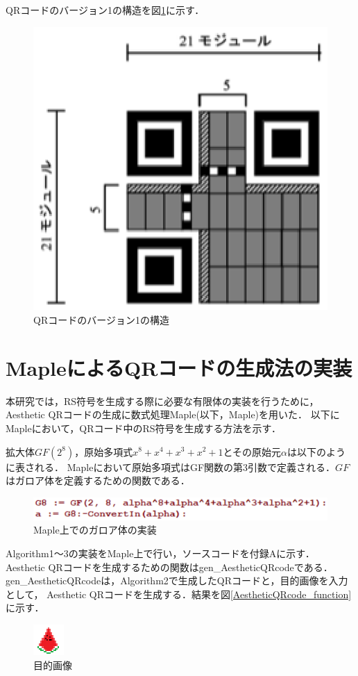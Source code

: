 \documentclass{thesis}
\begin{document}
QRコードのバージョン1の構造を図\ref{v1}に示す．

\begin{figure}[H]
      \centering
      \includegraphics[width=0.5\linewidth]{pic/v1.eps}
      \caption{QRコードのバージョン1の構造}
      \label{v1}
\end{figure}

\section{MapleによるQRコードの生成法の実装}

本研究では，RS符号を生成する際に必要な有限体の実装を行うために，Aesthetic QRコードの生成に数式処理Maple(以下，Maple)を用いた．
以下にMapleにおいて，QRコード中のRS符号を生成する方法を示す．

拡大体$GF(2^8)$，原始多項式$x^{8}+x^{4}+x^{3}+x^{2}+1$とその原始元$\alpha$は以下のように表される．
Mapleにおいて原始多項式はGF関数の第3引数で定義される．$GF$はガロア体を定義するための関数である．
\begin{figure}[H]
      \centering
      \includegraphics[width=0.8\linewidth]{pic/GF.eps}
      \caption{Maple上でのガロア体の実装}
      \label{Maple_GF}
\end{figure}

Algorithm1～3の実装をMaple上で行い，ソースコードを付録Aに示す．
Aesthetic QRコードを生成するための関数はgen\_AestheticQRcodeである．
gen\_AestheticQRcodeは，Algorithm2で生成したQRコードと，目的画像を入力として，
Aesthetic QRコードを生成する．結果を図\ref{AestheticQRcode_function}に示す．

\begin{figure}[H]
      \centering
      \includegraphics[width=0.25\linewidth]{pic/suika.eps}
      \caption{目的画像}
      \label{target}
\end{figure}
\end{document}
